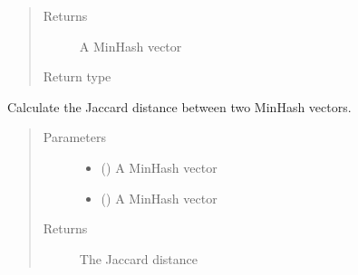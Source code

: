 \documentclass[letterpaper,10pt,english]{sphinxmanual}
\begin{document}
\begin{fulllineitems}
\begin{fulllineitems}
\begin{quote}
\begin{description}
\item[{Returns}] \leavevmode
A MinHash vector

\item[{Return type}] \leavevmode
{}

\end{description}\end{quote}

\end{fulllineitems}


\begin{fulllineitems}
\label{\detokenize{documentation:tmap.Minhash.get_distance}}
Calculate the Jaccard distance between two MinHash vectors.
\begin{quote}\begin{description}
\item[{Parameters}] \leavevmode\begin{itemize}
\item {} 
 () \textendash{} A MinHash vector

\item {} 
 () \textendash{} A MinHash vector

\end{itemize}

\item[{Returns}] \leavevmode
{} The Jaccard distance

\end{description}\end{quote}

\end{fulllineitems}



\end{fulllineitems}
\end{document}
